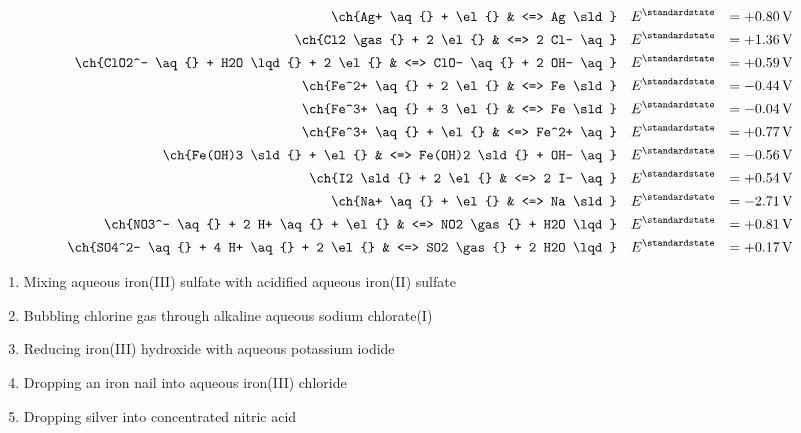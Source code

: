 \begin{alignat*}{3}
	\ch{Ag+ \aq{} + \el{}                   & <=> Ag \sld} \quad                  & E^\standardstate & = +\qty{0.80}{\volt} \\
	\ch{Cl2 \gas{} + 2 \el{}                & <=> 2 Cl- \aq} \quad                & E^\standardstate & = +\qty{1.36}{\volt} \\
	\ch{ClO2^- \aq{} + H2O \lqd{} + 2 \el{} & <=> ClO- \aq{} + 2 OH- \aq} \quad   & E^\standardstate & = +\qty{0.59}{\volt} \\
	\ch{Fe^2+ \aq{} + 2 \el{}               & <=> Fe \sld} \quad                  & E^\standardstate & = \qty{-0.44}{\volt} \\
	\ch{Fe^3+ \aq{} + 3 \el{}               & <=> Fe \sld} \quad                  & E^\standardstate & = \qty{-0.04}{\volt} \\
	\ch{Fe^3+ \aq{} + \el{}                 & <=> Fe^2+ \aq} \quad                & E^\standardstate & = +\qty{0.77}{\volt} \\
	\ch{Fe(OH)3 \sld{} + \el{}              & <=> Fe(OH)2 \sld{} + OH- \aq} \quad & E^\standardstate & = \qty{-0.56}{\volt} \\
	\ch{I2 \sld{} + 2 \el{}                 & <=> 2 I- \aq} \quad                 & E^\standardstate & = +\qty{0.54}{\volt} \\
	\ch{Na+ \aq{} + \el{}                   & <=> Na \sld} \quad                  & E^\standardstate & = \qty{-2.71}{\volt} \\
	\ch{NO3^- \aq{} + 2 H+ \aq{} + \el{}    & <=> NO2 \gas{} + H2O \lqd} \quad    & E^\standardstate & = +\qty{0.81}{\volt} \\
	\ch{SO4^2- \aq{} + 4 H+ \aq{} + 2 \el{} & <=> SO2 \gas{} + 2 H2O \lqd} \quad  & E^\standardstate & = +\qty{0.17}{\volt} \\
\end{alignat*}

\begin{enumerate}
	\item Mixing aqueous iron(III) sulfate with acidified aqueous iron(II) sulfate
	\item Bubbling chlorine gas through alkaline aqueous sodium chlorate(I)
	\item Reducing iron(III) hydroxide with aqueous potassium iodide
	\item Dropping an iron nail into aqueous iron(III) chloride
	\item Dropping silver into concentrated nitric acid
\end{enumerate}

